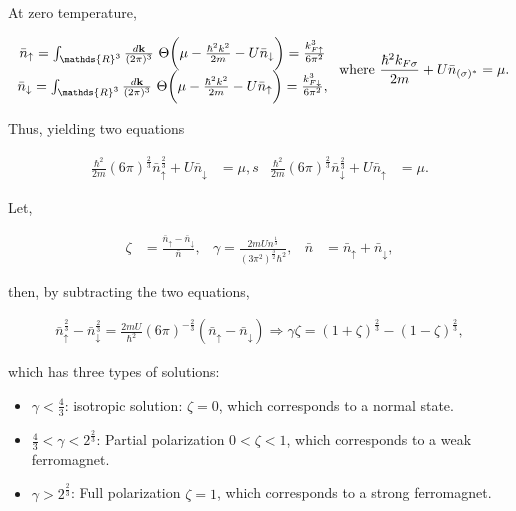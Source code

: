 \documentclass{homework}
\begin{document}

At zero temperature, 

\begin{align}
\begin{array}{c}
    {\bar n}_\uparrow = \int_{\mathds{R}^3} \frac{d {\bf k}}{(2\pi)^3} \blanky \Theta\bigg( \mu - \frac{\hbar^2 k^2}{2m} - U \bar{n}_\downarrow\bigg) = \frac{k_{F\uparrow}^3}{6\pi^2} \\
    {\bar n}_\downarrow = \int_{\mathds{R}^3} \frac{d {\bf k}}{(2\pi)^3} \blanky \Theta\bigg( \mu - \frac{\hbar^2 k^2}{2m} - U \bar{n}_\uparrow\bigg) = \frac{k_{F\downarrow}^3}{6\pi^2},
\end{array}
\textnormal{ where } \frac{\hbar^2 k_{F \sigma}}{2m} + U \bar{n}_{(\sigma)^{*}} = \mu.
\end{align}

Thus, yielding two equations 

\begin{align}
    \frac{\hbar^2}{2m} (6\pi)^{\frac{2}{3}} {\bar n}_{\uparrow}^{\frac{2}{3}} + U {\bar n}_{\downarrow} &= \mu,s & \frac{\hbar^2}{2m} (6\pi)^{\frac{2}{3}} {\bar n}_{\downarrow}^{\frac{2}{3}} + U {\bar n}_{\uparrow} &= \mu.
\end{align}

Let, 

\begin{align*}
    \zeta &= \frac{{\bar n}_{\uparrow}-{\bar n}_{\downarrow}}{{\bar n}}, & \gamma = \frac{2m U n^{\frac{1}{3}}}{(3\pi^2)^{\frac{3}{2}} \hbar^2}, & {\bar n} &= {\bar n}_{\uparrow} + {\bar n}_{\downarrow},
\end{align*}

then, by subtracting the two equations,

\begin{align}
    {\bar n}_{\uparrow}^{\frac{2}{3}} - {\bar n}_{\downarrow}^{\frac{2}{3}} = \frac{2mU}{\hbar^2} (6\pi)^{-\frac{2}{3}} ({\bar n}_{\uparrow}-{\bar n}_{\downarrow}) \Rightarrow \gamma \zeta = (1+\zeta)^{\frac{2}{3}} - (1-\zeta)^{\frac{2}{3}},
\end{align}

which has three types of solutions:

\begin{itemize}
    \item $\gamma < \frac{4}{3}$: isotropic solution: $\zeta = 0$, which corresponds to a normal state.
    \item $\frac{4}{3} < \gamma < 2^{\frac{2}{3}}$: Partial polarization $0 < \zeta < 1$, which corresponds to a weak ferromagnet.
    \item $\gamma > 2^{\frac{2}{3}}$: Full polarization $\zeta = 1$, which corresponds to a strong ferromagnet. \\
\end{itemize}
\end{document}
